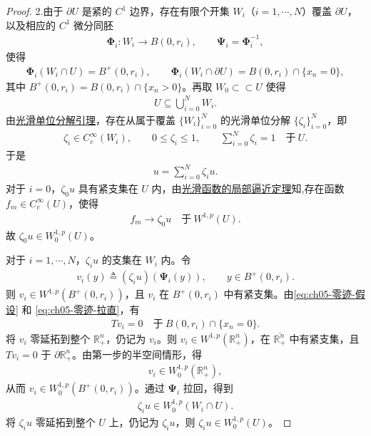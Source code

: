 \documentclass[../../main.tex]{subfiles}
\begin{document}
\begin{proof}
2.由于 $\partial U$ 是紧的 $C^{1}$ 边界，存在有限个开集 $W_{i}$（$i=1,\cdots,N$）覆盖 $\partial U$，以及相应的 $C^{1}$ 微分同胚
\begin{align*}
\boldsymbol{\Phi}_{i}:W_{i}\to B(0,r_{i}),\qquad \boldsymbol{\Psi}_{i}=\boldsymbol{\Phi}_{i}^{-1},
\end{align*}
使得
\begin{align}\label{eq:ch05-零迹-拉直}
\boldsymbol{\Phi}_{i}(W_{i}\cap U)=B^{+}(0,r_{i}),\qquad
\boldsymbol{\Phi}_{i}(W_{i}\cap\partial U)=B(0,r_{i})\cap\{x_{n}=0\},
\end{align}
其中 $B^{+}(0,r_{i})=B(0,r_{i})\cap\{x_{n}>0\}$。再取 $W_{0}\subset\subset U$ 使得
\begin{align*}
U\subseteq \bigcup_{i=0}^{N}W_{i}.
\end{align*}
由\hyperref[lemma:ch05-光滑单位分解-p7R3]{光滑单位分解引理}，存在从属于覆盖 $\{W_{i}\}_{i=0}^{N}$ 的光滑单位分解 $\{\zeta_{i}\}_{i=0}^{N}$，即
\begin{align*}
\zeta_{i}\in C_{c}^{\infty}(W_{i}),\qquad 0\leqslant \zeta_{i}\leqslant 1,\qquad
\sum_{i=0}^{N}\zeta_{i}=1\quad\text{于}\ U.
\end{align*}
于是
\begin{align}\label{eq:ch05-零迹-分解}
u=\sum_{i=0}^{N}\zeta_{i}u.
\end{align}
对于 $i=0$，$\zeta_{0}u$ 具有紧支集在 $U$ 内，由\hyperref[theorem:ch05-光滑函数的局部逼近定理]{光滑函数的局部逼近定理}知,存在函数 $f_{m}\in C^{\infty}_{c}(U)$，使得
\begin{align*}
f_{m}\to \zeta_{0}u\quad\text{于}\ W^{1,p}(U).
\end{align*}
故 $\zeta_{0}u\in W^{1,p}_{0}(U)$。

对于 $i=1,\cdots,N$，$\zeta_{i}u$ 的支集在 $W_{i}$ 内。令
\begin{align*}
v_{i}(y)\triangleq (\zeta_{i}u)(\boldsymbol{\Psi}_{i}(y)),\qquad y\in B^{+}(0,r_{i}).
\end{align*}
则 $v_{i}\in W^{1,p}(B^{+}(0,r_{i}))$，且 $v_{i}$ 在 $B^{+}(0,r_{i})$ 中有紧支集。由\eqref{eq:ch05-零迹-假设} 和 \eqref{eq:ch05-零迹-拉直}，有
\begin{align*}
Tv_{i}=0\quad\text{于}\ B(0,r_{i})\cap\{x_{n}=0\}.
\end{align*}
将 $v_{i}$ 零延拓到整个 $\mathbb{R}^{n}_{+}$，仍记为 $v_{i}$。则 $v_{i}\in W^{1,p}(\mathbb{R}^{n}_{+})$，在 $\overline{\mathbb{R}^{n}_{+}}$ 中有紧支集，且 $Tv_{i}=0$ 于 $\partial\mathbb{R}^{n}_{+}$。由第一步的半空间情形，得
\begin{align*}
v_{i}\in W^{1,p}_{0}(\mathbb{R}^{n}_{+}),
\end{align*}
从而 $v_{i}\in W^{1,p}_{0}(B^{+}(0,r_{i}))$。通过 $\boldsymbol{\Psi}_{i}$ 拉回，得到
\begin{align*}
\zeta_{i}u\in W^{1,p}_{0}(W_{i}\cap U).
\end{align*}
将 $\zeta_{i}u$ 零延拓到整个 $U$ 上，仍记为 $\zeta_{i}u$，则 $\zeta_{i}u\in W^{1,p}_{0}(U)$。


\end{proof}
\end{document}
